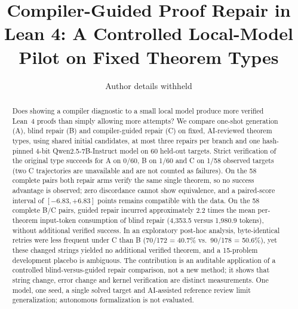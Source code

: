 \documentclass[runningheads,a4paper]{llncs}
\newif\ifreview
\begin{document}
\title{Compiler-Guided Proof Repair in Lean 4: A Controlled Local-Model Pilot on Fixed Theorem Types}
\ifreview
  \author{Anonymous author}
  \authorrunning{Anonymous author}
  \institute{Anonymous institution}
\else
  \author{Author details withheld}
\fi
\maketitle

\begin{abstract}
Does showing a compiler diagnostic to a small local model produce more verified
Lean~4 proofs than simply allowing more attempts? We compare one-shot generation (A),
blind repair (B) and compiler-guided repair (C) on fixed, AI-reviewed theorem types,
using shared initial candidates, at most three repairs per branch and one
hash-pinned 4-bit Qwen2.5-7B-Instruct model on 60 held-out targets. Strict
verification of the original type succeeds for A on 0/60, B on 1/60 and C on 1/58
observed targets (two C trajectories are unavailable and are not counted as failures).
On the 58 complete pairs both repair arms verify the same single theorem, so no
success advantage is observed; zero discordance cannot show equivalence, and a
paired-score interval of $[-6.83,+6.83]$ points remains compatible with the data.
On the 58 complete B/C pairs, guided repair incurred approximately 2.2 times the mean per-theorem input-token consumption of blind repair (4,353.5 versus 1,980.9 tokens), without additional verified success.
In an exploratory post-hoc analysis, byte-identical retries were less frequent under C
than B (70/172 = 40.7\% vs.\ 90/178 = 50.6\%), yet these changed strings yielded no
additional verified theorem, and a 15-problem development placebo is ambiguous.
The contribution is an auditable application of a controlled blind-versus-guided repair comparison, not a new method; it shows that string change, error change and kernel verification are distinct measurements. One model,
one seed, a single solved target and AI-assisted reference review limit
generalization; autonomous formalization is not evaluated.
\end{abstract}

\end{document}
